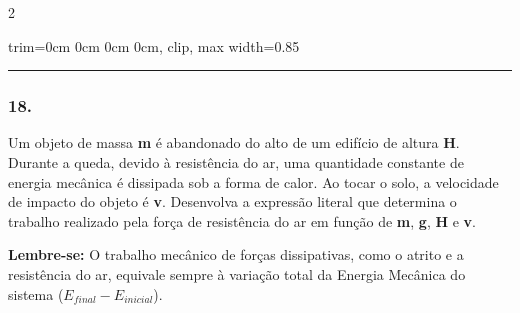 \documentclass[twoside, 10pt, a4paper]{article}
\newlength{\espacoPreQuestao}\setlength{\espacoPreQuestao}{0.1cm}
\newlength{\espacoQuestao}\setlength{\espacoQuestao}{0.2cm}
\newcommand{\larguraTikz}{0.85\linewidth}
\begin{document}
\begin{multicols*}{2}
\begin{center}
\begin{adjustbox}{trim=0cm 0cm 0cm 0cm, clip, max width=\larguraTikz}
\end{adjustbox}
\end{center}
\par\vspace{\espacoQuestao}

\noindent\textcolor{CorLinha}{\rule{\linewidth}{0.5pt}} 
\par\vspace{\espacoPreQuestao}
\subsubsection*{18.} 
Um objeto de massa \textbf{m} é abandonado do alto de um edifício de altura \textbf{H}. Durante a queda, devido à resistência do ar, uma quantidade constante de energia mecânica é dissipada sob a forma de calor. Ao tocar o solo, a velocidade de impacto do objeto é \textbf{v}. Desenvolva a expressão literal que determina o trabalho realizado pela força de resistência do ar em função de \textbf{m}, \textbf{g}, \textbf{H} e \textbf{v}.
\begin{boxdica}
\textbf{Lembre-se:} O trabalho mecânico de forças dissipativas, como o atrito e a resistência do ar, equivale sempre à variação total da Energia Mecânica do sistema ($E_{final} - E_{inicial}$).
\end{boxdica}

\par\vspace{\espacoQuestao}


\end{multicols*}
\end{document}
